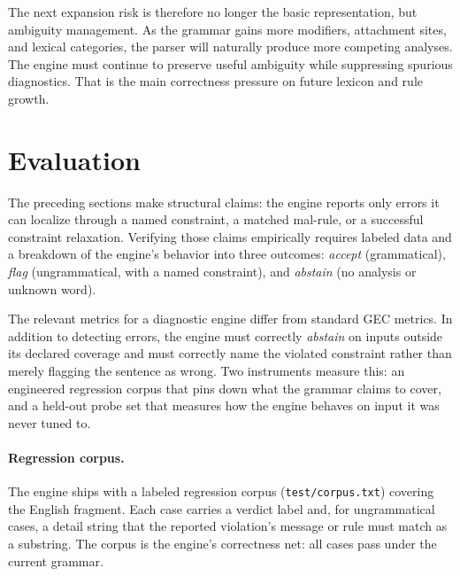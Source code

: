 \documentclass[11pt]{article}
\theoremstyle{definition}
\theoremstyle{plain}
\theoremstyle{remark}
\begin{document}
The next expansion risk is therefore no longer the basic representation, but
ambiguity management. As the grammar gains more modifiers, attachment sites, and
lexical categories, the parser will naturally produce more competing analyses.
The engine must continue to preserve useful ambiguity while suppressing spurious
diagnostics. That is the main correctness pressure on future lexicon and rule
growth.

\section{Evaluation}
\label{sec:evaluation}

The preceding sections make structural claims: the engine reports only errors it can
localize through a named constraint, a matched mal-rule, or a successful constraint
relaxation. Verifying those claims empirically requires labeled data and a breakdown of
the engine's behavior into three outcomes: \emph{accept} (grammatical), \emph{flag}
(ungrammatical, with a named constraint), and \emph{abstain} (no analysis or unknown
word).

The relevant metrics for a diagnostic engine differ from standard GEC metrics. In addition
to detecting errors, the engine must correctly \emph{abstain} on inputs outside its declared
coverage and must correctly name the violated constraint rather than merely flagging the
sentence as wrong. Two instruments measure this: an engineered regression corpus that
pins down what the grammar claims to cover, and a held-out probe set that measures how
the engine behaves on input it was never tuned to.

\paragraph{Regression corpus.}
The engine ships with a labeled regression corpus (\texttt{test/corpus.txt}) covering the
English fragment. Each case carries a verdict label and, for ungrammatical cases, a detail
string that the reported violation's message or rule must match as a substring. The corpus
is the engine's correctness net: all cases pass under the current grammar.
\end{document}
